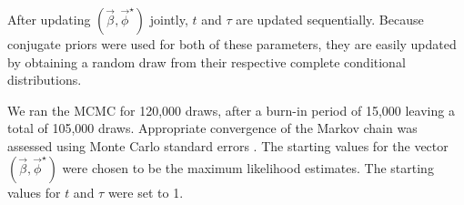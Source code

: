 After updating $(\vec{\beta},\vec{\phi}^\star)$ jointly,  $t$ and  $\tau$ are updated sequentially. Because conjugate priors were used for both of these parameters, they are easily updated by obtaining a random draw from their respective complete conditional distributions.
 
We ran the MCMC for 120,000 draws, after a burn-in period of 15,000 leaving a total of 105,000 draws.  Appropriate convergence of the Markov chain was assessed using Monte Carlo standard errors \citep{jones06}.  The starting values for the vector $(\vec{\beta},\vec{\phi}^\star)$ were chosen to be the maximum likelihood estimates. The starting values for $t$ and $\tau$ were set to 1.

 


